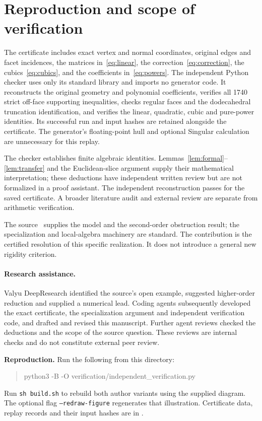 \documentclass[11pt]{amsart}
\theoremstyle{remark}
\begin{document}
\newpage
\section{Reproduction and scope of verification}

The certificate includes exact vertex and normal coordinates, original edges and facet incidences, the matrices in~\eqref{eq:linear}, the correction~\eqref{eq:correction}, the cubics~\eqref{eq:cubics}, and the coefficients in~\eqref{eq:powers}. The independent Python checker uses only its standard library and imports no generator code. It reconstructs the original geometry and polynomial coefficients, verifies all 1740 strict off-face supporting inequalities, checks regular faces and the dodecahedral truncation identification, and verifies the linear, quadratic, cubic and pure-power identities. Its successful run and input hashes are retained alongside the certificate. The generator's floating-point hull and optional Singular calculation are unnecessary for this replay.

The checker establishes finite algebraic identities. Lemmas~\ref{lem:formal}--\ref{lem:transfer} and the Euclidean-slice argument supply their mathematical interpretation; these deductions have independent written review but are not formalized in a proof assistant. The independent reconstruction passes for the saved certificate. A broader literature audit and external review are separate from arithmetic verification.

The source~\cite{AHWZ2026} supplies the model and the second-order obstruction result; the specialization and local-algebra machinery are standard. The contribution is the certified resolution of this specific realization. It does not introduce a general new rigidity criterion.

\paragraph{Research assistance.}
Valyu DeepResearch identified the source's open example, suggested higher-order reduction and supplied a numerical lead. Coding agents subsequently developed the exact certificate, the specialization argument and independent verification code, and drafted and revised this manuscript. Further agent reviews checked the deductions and the scope of the source question. These reviews are internal checks and do not constitute external peer review.

\smallskip
\noindent\textbf{Reproduction.} Run the following from this directory:
\begin{quote}\small\ttfamily
python3 -B -O verification/independent\_verification.py
\end{quote}
Run \texttt{sh build.sh} to rebuild both author variants using the supplied diagram. The optional flag \texttt{--redraw-figure} regenerates that illustration. Certificate data, replay records and their input hashes are in .



\end{document}
